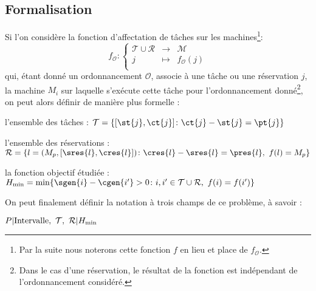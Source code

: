 \subsection{Formalisation}
    Si l'on considère la fonction d'affectation de tâches sur les machines\footnote{Par la suite
    nous noterons cette fonction $f$ en lieu et place de $f_{\mathcal{O}}$.}: \[
        f_{\mathcal{O}} : \left \lbrace \begin{array}{rcl}
            \mathcal{T} \cup \mathcal{R} & \longrightarrow & \mathcal{M} \\
            j & \mapsto & f_{\mathcal{O}}(j) \\
        \end{array}
        \right .
    \]
    qui, étant donné un ordonnancement $\mathcal{O}$, associe à une tâche ou une réservation $j$, la
    machine $M_i$ sur laquelle s'exécute cette tâche pour l'ordonnancement donné\footnote{Dans le
    cas d'une réservation, le résultat de la fonction est indépendant de l'ordonnancement
    considéré.}, on peut alors définir de manière plus formelle : \begin{bitemize}
        \item l'ensemble des tâches : \hfill $ \mathcal{T} = \{[\st{j}, \ct{j}]   \colon  
            \ct{j} - \st{j} = \pt{j} \} $
        \item l'ensemble des réservations : \hfill $\mathcal{R} = \{l = (M_p, [\sres{l}, \cres{l}])  
            \colon   \cres{l} - \sres{l} = \pres{l},\ f(l) = M_p\}$
        \item la fonction objectif étudiée : \hfill $H_{\min} = \min \{ \sgen{i} - \cgen{i'} > 0  
            \colon   i,i' \in \mathcal{T} \cup \mathcal{R},\ f(i) = f(i')\}$
    \end{bitemize}

    On peut finalement définir la notation à trois champs de ce problème, à savoir : 
    \begin{center}
        $P \arrowvert \mbox{Intervalle},\ \mathcal{T},\ \mathcal{R} \arrowvert H_{\min}$
    \end{center}
    

